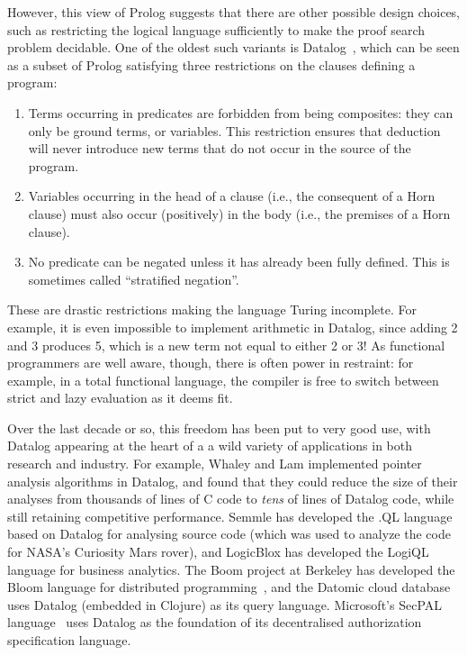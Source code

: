 However, this view of Prolog suggests that there are other possible
design choices, such as restricting the logical language sufficiently
to make the proof search problem decidable. One of the oldest such
variants is Datalog~\cite{datalog}, which can be seen as a subset of
Prolog satisfying three restrictions on the clauses defining a program:
\begin{enumerate}
\item Terms occurring in predicates are forbidden from being
  composites: they can only be ground terms, or variables. This
  restriction ensures that deduction will never introduce new terms
  that do not occur in the source of the program.
\item Variables occurring in the head of a clause (i.e., the
  consequent of a Horn clause) must also occur (positively) in the
  body (i.e., the premises of a Horn clause).
\item No predicate can be negated unless it has already been fully
  defined.  This is sometimes called ``stratified negation''.
\end{enumerate}
These are drastic restrictions making the language Turing
incomplete. For example, it is even impossible to implement arithmetic
in Datalog, since adding 2 and 3 produces 5, which is a new term not
equal to either 2 or 3!  As functional programmers are well aware,
though, there is often power in restraint: for example, in a total
functional language, the compiler is free to switch between strict and
lazy evaluation as it deems fit.

Over the last decade or so, this freedom has been put to very good
use, with Datalog appearing at the heart of a a wild variety of
applications in both research and industry.  For example, Whaley and
Lam \cite{whaley-lam,whaley-phd} implemented pointer analysis
algorithms in Datalog, and found that they could reduce the size of
their analyses from thousands of lines of C code to \emph{tens} of
lines of Datalog code, while still retaining competitive
performance. Semmle has developed the .QL
language~\cite{semmlecode,ql-inference} based on Datalog for analysing
source code (which was used to analyze the code for NASA's Curiosity
Mars rover), and LogicBlox has developed the LogiQL~\cite{logicblox}
language for business analytics. The Boom project at Berkeley has
developed the Bloom language for distributed programming~\cite{bloom},
and the Datomic cloud database~\cite{datomic} uses Datalog (embedded
in Clojure) as its query language. Microsoft's SecPAL
language~\cite{secpal} uses Datalog as the foundation of its
decentralised authorization specification language.

